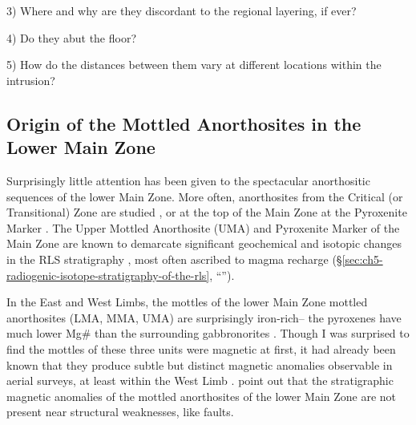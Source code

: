 3) Where and why are they discordant to the regional layering, if ever?

4) Do they abut the floor?

5) How do the distances between them vary at different locations within
the intrusion?

\subsection{Origin of the Mottled Anorthosites in the Lower Main Zone}
\label{sec:ch5-origin-of-the-mottled-anorthosites-in-the-lower-main-zone}

Surprisingly little attention has been given to the spectacular
anorthositic sequences of the lower Main Zone. More often, anorthosites
from the Critical (or Transitional) Zone are studied \citep{mitchell2002,maier2016,mitchell2019,maier2020,barnes2021}, or at the top of the Main Zone at the
Pyroxenite Marker \citep{bourdeau2021,bourdeau2023}. The Upper Mottled
Anorthosite (UMA) and Pyroxenite Marker of the Main Zone are known to
demarcate significant geochemical and isotopic changes in the RLS
stratigraphy \citep{klemm1985,kruger1994,vantongeren2013}, most often ascribed to magma recharge (\S\ref{sec:ch5-radiogenic-isotope-stratigraphy-of-the-rls}, ``'').

In the East and West Limbs, the mottles of the lower Main Zone mottled
anorthosites (LMA, MMA, UMA) are surprisingly iron-rich-- the pyroxenes
have much lower Mg\# than the surrounding gabbronorites \citep{scoonmitchell1994,mitchelleales1998}. Though I was surprised to find
the mottles of these three units were magnetic at first, it had already
been known that they produce subtle but distinct magnetic anomalies
observable in aerial surveys, at least within the West Limb \citep{viljoen1985,cole2013}. \citet{viljoen1985} point out that
the stratigraphic magnetic anomalies of the mottled anorthosites of the
lower Main Zone are not present near structural weaknesses, like faults.

